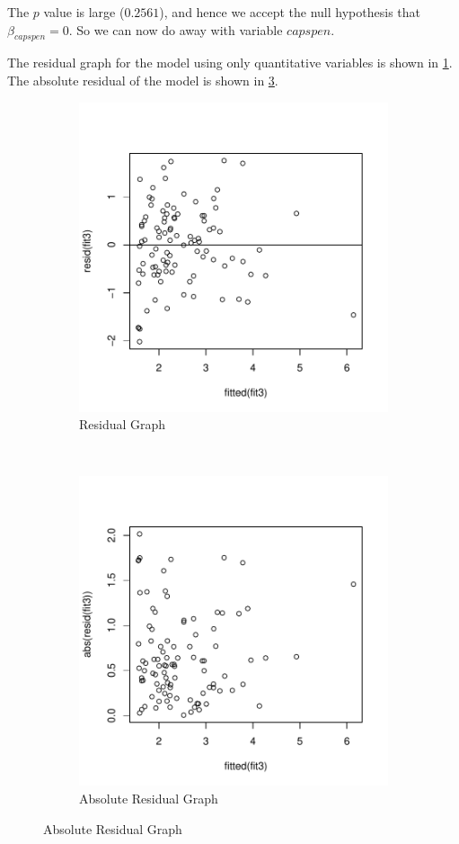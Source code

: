 \documentclass[12pt,letterpaper,titlepage,en-US]{article}
\begin{document}
The $p$ value is large ($0.2561$), and hence we accept the null hypothesis that $\beta_{capspen} = 0$. So we can now do away with variable $capspen$.


\pagebreak

The residual graph for the model using only quantitative variables is shown in \cref{rgmq}.
The absolute residual of the model is shown in \cref{abrgmq}.
\begin{figure}[H]
    \centering
    \begin{subfigure}[t]{0.5\textwidth}
        \centering
        \caption{Residual Graph}\label{rgmq}
        \includegraphics[width=.95\textwidth]{fig/residualplotfit3.pdf}
    \end{subfigure}%
    ~
    \begin{subfigure}[t]{0.5\textwidth}
        \centering
        \caption{Absolute Residual Graph}\label{abrgmq}
        \includegraphics[width=.95\textwidth]{fig/plotfit3abu.pdf}

\end{subfigure}
\end{figure}
\end{document}
